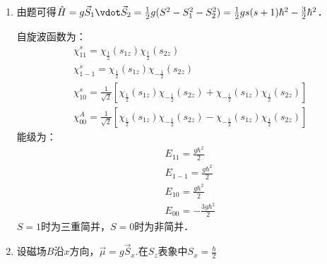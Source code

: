\subsection{ }
\begin{enumerate}
\item 由题可得$\hat{H} = g \vec{S}_{1}\vdot \vec{S}_{2} = \frac{1}{2}g(S^{2}-S^{2}_{1}-S^{2}_{2}) = \frac{1}{2}gs(s+1)\hbar^{2}-\frac{3}{2}\hbar^2 $．

自旋波函数为：
\begin{align}
& \chi^{s}_{11} = \chi_{\frac{1}{2}}(s_{1z})\chi_{\frac{1}{2}}(s_{2z}) \\
& \chi^{s}_{1-1} = \chi_{\frac{1}{2}}(s_{1z})\chi_{-\frac{1}{2}}(s_{2z}) \\
&\chi^{s}_{10} = \frac{1}{\sqrt{2}} \left[ \chi_{\frac{1}{2}}(s_{1z})\chi_{-\frac{1}{2}}(s_{2z}) + \chi_{-\frac{1}{2}}(s_{1z})\chi_{\frac{1}{2}}(s_{2z})  \right] \\
&\chi^{A}_{00} = \frac{1}{\sqrt{2}} \left[ \chi_{\frac{1}{2}}(s_{1z})\chi_{-\frac{1}{2}}(s_{2z}) - \chi_{-\frac{1}{2}}(s_{1z})\chi_{\frac{1}{2}}(s_{2z})  \right]
\end{align}
能级为：
\begin{align}
&E_{11} =\frac{g\hbar^{2}}{2}  \\
&E_{1-1} =\frac{g\hbar^{2}}{2}  \\
&E_{10} =\frac{g\hbar^{2}}{2}  \\
&E_{00} =-\frac{3g\hbar^{2}}{2}  
\end{align}
$S=1$时为三重简并，$S=0$时为非简并．
\item 设磁场$B$沿$x$方向，$\vec{\mu} = g \vec{S}_{x} $.在$S_{z}$表象中$S_{x} = \frac{\hbar}{2} $
\end{enumerate}

